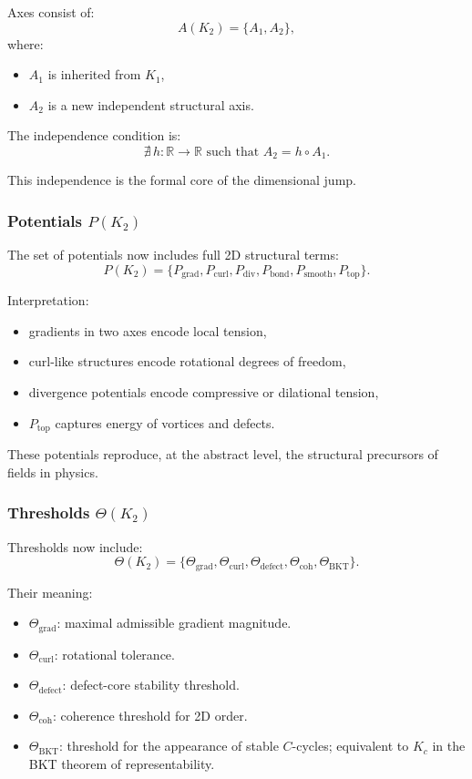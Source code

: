 Axes consist of:
\[
A(K_2) = \{A_1, A_2\},
\]
where:
\begin{itemize}
    \item $A_1$ is inherited from $K_1$,
    \item $A_2$ is a new independent structural axis.
\end{itemize}

The independence condition is:
\[
\nexists\, h: \mathbb{R} \to \mathbb{R} \text{ such that } A_2 = h \circ A_1.
\]

This independence is the formal core of the dimensional jump.

\subsubsection{Potentials \texorpdfstring{$P(K_2)$}{P(K_2)}}

The set of potentials now includes full 2D structural terms:
\[
P(K_2) =
\{ P_{\mathrm{grad}}, P_{\mathrm{curl}}, P_{\mathrm{div}},
   P_{\mathrm{bond}}, P_{\mathrm{smooth}}, P_{\mathrm{top}} \}.
\]

Interpretation:
\begin{itemize}
    \item gradients in two axes encode local tension,
    \item curl-like structures encode rotational degrees of freedom,
    \item divergence potentials encode compressive or dilational tension,
    \item $P_{\mathrm{top}}$ captures energy of vortices and defects.
\end{itemize}

These potentials reproduce, at the abstract level, the structural
precursors of fields in physics.

\subsubsection{Thresholds \texorpdfstring{$\Theta(K_2)$}{\Theta(K_2)}}

Thresholds now include:
\[
\Theta(K_2) =
\{\Theta_{\mathrm{grad}}, \Theta_{\mathrm{curl}},
  \Theta_{\mathrm{defect}}, \Theta_{\mathrm{coh}},
  \Theta_{\mathrm{BKT}}\}.
\]

Their meaning:
\begin{itemize}
    \item $\Theta_{\mathrm{grad}}$: maximal admissible gradient magnitude.
    \item $\Theta_{\mathrm{curl}}$: rotational tolerance.
    \item $\Theta_{\mathrm{defect}}$: defect-core stability threshold.
    \item $\Theta_{\mathrm{coh}}$: coherence threshold for 2D order.
    \item $\Theta_{\mathrm{BKT}}$: threshold for the appearance of
          stable $C$-cycles; equivalent to $K_c$ in the BKT theorem of
          representability.
\end{itemize}

